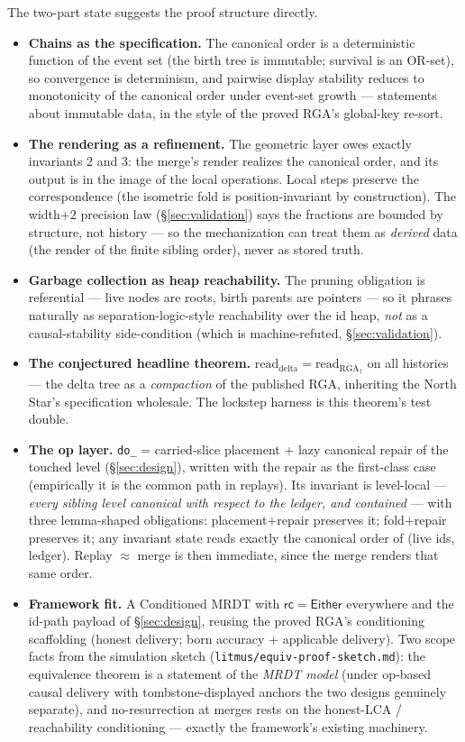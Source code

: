 \documentclass[11pt]{article}
\begin{document}
The two-part state suggests the proof structure directly.
\begin{itemize}
\item \textbf{Chains as the specification.} The canonical order is a
deterministic function of the event set (the birth tree is immutable;
survival is an OR-set), so convergence is determinism, and pairwise
display stability reduces to monotonicity of the canonical order under
event-set growth --- statements about immutable data, in the style of the
proved RGA's global-key re-sort.
\item \textbf{The rendering as a refinement.} The geometric layer owes
exactly invariants 2 and 3: the merge's render realizes the canonical
order, and its output is in the image of the local operations. Local
steps preserve the correspondence (the isometric fold is
position-invariant by construction). The width$+2$ precision law
(\S\ref{sec:validation}) says the fractions are bounded by structure,
not history --- so the mechanization can treat them as \emph{derived}
data (the render of the finite sibling order), never as stored truth.
\item \textbf{Garbage collection as heap reachability.} The pruning
obligation is referential --- live nodes are roots, birth parents are
pointers --- so it phrases naturally as separation-logic-style
reachability over the id heap, \emph{not} as a causal-stability
side-condition (which is machine-refuted, \S\ref{sec:validation}).
\item \textbf{The conjectured headline theorem.}
$\mathrm{read}_{\text{delta}} = \mathrm{read}_{\mathrm{RGA}_\dagger}$ on
all histories --- the delta tree as a \emph{compaction} of the published
RGA, inheriting the North Star's specification wholesale. The lockstep
harness is this theorem's test double.
\item \textbf{The op layer.} \texttt{do\_} = carried-slice placement +
lazy canonical repair of the touched level (\S\ref{sec:design}), written
with the repair as the first-class case (empirically it is the common
path in replays). Its invariant is level-local --- \emph{every sibling
level canonical with respect to the ledger, and contained} --- with three
lemma-shaped obligations: placement$+$repair preserves it; fold$+$repair
preserves it; any invariant state reads exactly the canonical order of
(live ids, ledger). Replay $\approx$ merge is then immediate, since the
merge renders that same order.
\item \textbf{Framework fit.} A Conditioned MRDT with $\mathsf{rc} =
\textsf{Either}$ everywhere and the id-path payload of
\S\ref{sec:design}, reusing the proved RGA's conditioning scaffolding
(honest delivery; born accuracy + applicable delivery). Two scope facts
from the simulation sketch (\texttt{litmus/equiv-proof-sketch.md}): the
equivalence theorem is a statement of the \emph{MRDT model} (under
op-based causal delivery with tombstone-displayed anchors the two designs
genuinely separate), and no-resurrection at merges rests on the honest-LCA
/ reachability conditioning --- exactly the framework's existing
machinery.
\end{itemize}
\end{document}
